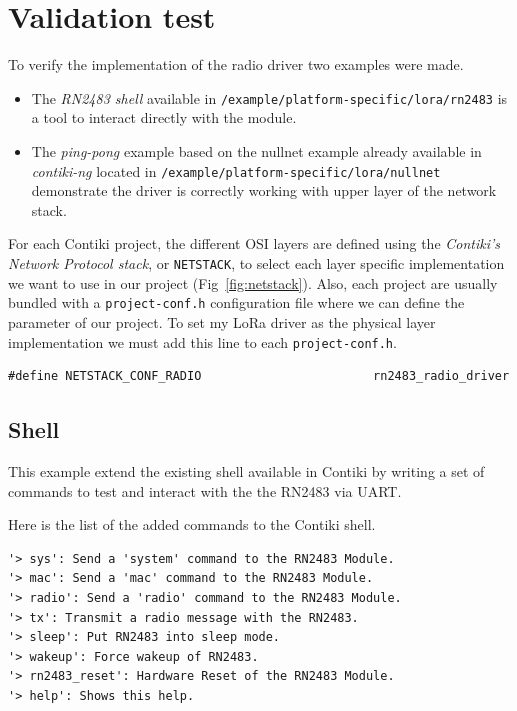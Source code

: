 
\section{Validation test}


To verify the implementation of the radio driver two examples were made.

\begin{itemize}
  \item The \emph{RN2483 shell} available in
    \lstinline{/example/platform-specific/lora/rn2483} is a tool to interact
    directly with the module.
  \item The \emph{ping-pong} example based on the nullnet example already
    available in \emph{contiki-ng} located in 
    \lstinline{/example/platform-specific/lora/nullnet} demonstrate the driver
    is correctly working with upper layer of the network stack.
\end{itemize}

For each Contiki project, the different OSI layers are defined using the
\emph{Contiki's Network Protocol stack}, or \lstinline{NETSTACK}, to select
each layer specific implementation we want to use in our project (Fig~\ref{fig:netstack}).
Also, each project are usually bundled with a \lstinline{project-conf.h}
configuration file where we can define the parameter of our project. 
To set my LoRa driver as the physical layer implementation we must add this line to
each \lstinline{project-conf.h}.

\begin{lstlisting}
#define NETSTACK_CONF_RADIO                        rn2483_radio_driver
\end{lstlisting}



\subsection{Shell}

This example extend the existing shell available in Contiki by writing a set
of commands to test and interact with the the RN2483 via UART\@.

Here is the list of the added commands to the Contiki shell.

\begin{lstlisting}
'> sys': Send a 'system' command to the RN2483 Module.
'> mac': Send a 'mac' command to the RN2483 Module.
'> radio': Send a 'radio' command to the RN2483 Module.
'> tx': Transmit a radio message with the RN2483.
'> sleep': Put RN2483 into sleep mode.
'> wakeup': Force wakeup of RN2483.
'> rn2483_reset': Hardware Reset of the RN2483 Module.
'> help': Shows this help.
\end{lstlisting}

